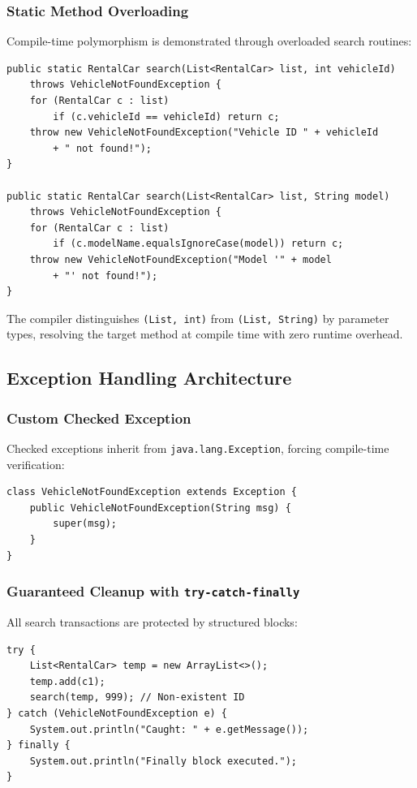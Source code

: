 \documentclass[11pt,a4paper]{article}
\begin{document}
\subsubsection{Static Method Overloading}
Compile-time polymorphism is demonstrated through overloaded search routines:
\begin{lstlisting}[caption={Overloaded Search with Differentiated Signatures}]
public static RentalCar search(List<RentalCar> list, int vehicleId)
    throws VehicleNotFoundException {
    for (RentalCar c : list)
        if (c.vehicleId == vehicleId) return c;
    throw new VehicleNotFoundException("Vehicle ID " + vehicleId
        + " not found!");
}

public static RentalCar search(List<RentalCar> list, String model)
    throws VehicleNotFoundException {
    for (RentalCar c : list)
        if (c.modelName.equalsIgnoreCase(model)) return c;
    throw new VehicleNotFoundException("Model '" + model
        + "' not found!");
}
\end{lstlisting}
The compiler distinguishes \texttt{(List, int)} from \texttt{(List, String)} by parameter types, resolving the target method at compile time with zero runtime overhead.

\subsection{Exception Handling Architecture}

\subsubsection{Custom Checked Exception}
Checked exceptions inherit from \texttt{java.lang.Exception}, forcing compile-time verification:
\begin{lstlisting}[caption={Custom Checked Domain Exception}]
class VehicleNotFoundException extends Exception {
    public VehicleNotFoundException(String msg) {
        super(msg);
    }
}
\end{lstlisting}

\subsubsection{Guaranteed Cleanup with \texttt{try-catch-finally}}
All search transactions are protected by structured blocks:
\begin{lstlisting}[caption={Try-Catch-Finally Execution}]
try {
    List<RentalCar> temp = new ArrayList<>();
    temp.add(c1);
    search(temp, 999); // Non-existent ID
} catch (VehicleNotFoundException e) {
    System.out.println("Caught: " + e.getMessage());
} finally {
    System.out.println("Finally block executed.");
}
\end{lstlisting}
\end{document}
